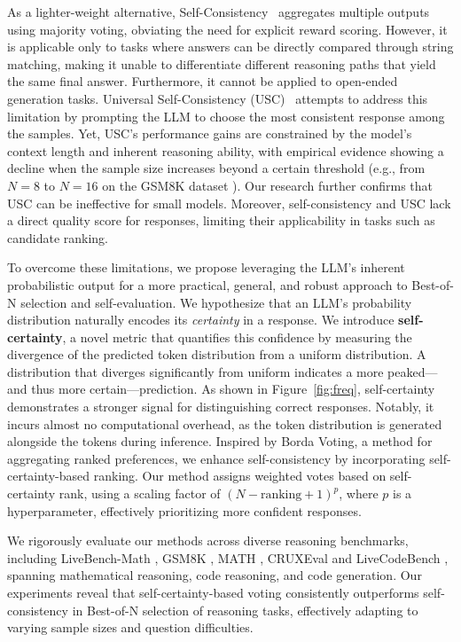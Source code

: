 As a lighter-weight alternative, Self-Consistency~\citep{wang2022self} aggregates multiple outputs using majority voting, obviating the need for explicit reward scoring. However, it is applicable only to tasks where answers can be directly compared through string matching, making it unable to differentiate different reasoning paths that yield the same final answer.  
Furthermore, it cannot be applied to open-ended generation tasks. Universal Self-Consistency (USC)~\citep{chen2023universal} attempts to address this limitation by prompting the LLM to choose the most consistent response among the samples. Yet, USC’s performance gains are constrained by the model’s context length and inherent reasoning ability, with empirical evidence showing a decline when the sample size increases beyond a certain threshold (e.g., from $N = 8$ to $N = 16$ on the GSM8K dataset \cite{gsm}). Our research further confirms that USC can be ineffective for small models. Moreover, self-consistency and USC lack a direct quality score for responses, limiting their applicability in tasks such as candidate ranking.

To overcome these limitations, we propose leveraging the LLM's inherent probabilistic output for a more practical, general, and robust approach to Best-of-N selection and self-evaluation.  We hypothesize that an LLM’s probability distribution naturally encodes its \emph{certainty} in a response. We introduce \textbf{self-certainty}, a novel metric that quantifies this confidence by measuring the divergence of the predicted token distribution from a uniform distribution. A distribution that diverges significantly from uniform indicates a more peaked—and thus more certain—prediction. As shown in  Figure~\ref{fig:freq}, self-certainty demonstrates a stronger signal for distinguishing correct responses. Notably, it incurs almost no computational overhead, as the token distribution is generated alongside the tokens during inference. Inspired by Borda Voting, a method for aggregating ranked preferences, we enhance self-consistency by incorporating self-certainty-based ranking.  Our method assigns weighted votes based on self-certainty rank, using a scaling factor of $(N-\text{ranking}+1)^p$, where $p$ is a hyperparameter, effectively prioritizing more confident responses.

We rigorously evaluate our methods across diverse reasoning benchmarks, including LiveBench-Math \cite{white2024livebench}, GSM8K \cite{gsm}, MATH \cite{MATH}, CRUXEval \cite{gu2024cruxeval} and LiveCodeBench \cite{jain2024livecodebench}, spanning mathematical reasoning, code reasoning, and code generation. Our experiments reveal that self-certainty-based voting consistently outperforms self-consistency in Best-of-N selection of reasoning tasks, effectively adapting to varying sample sizes and question difficulties.

